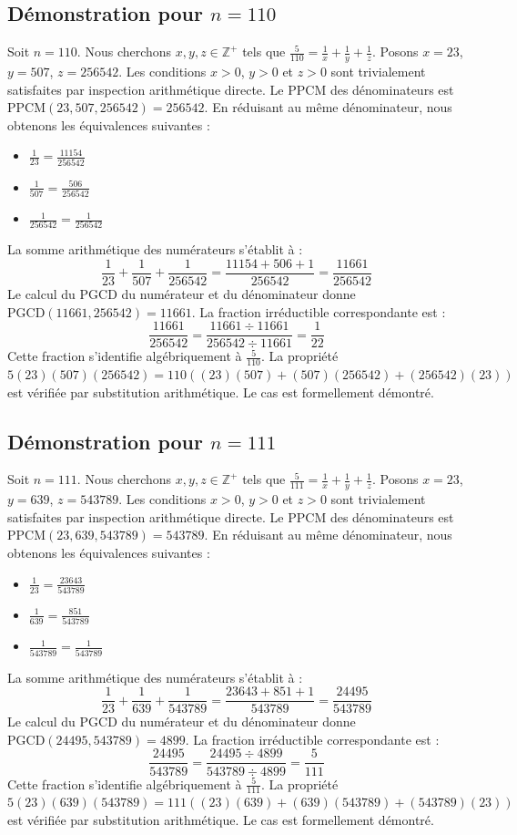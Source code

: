 \documentclass[12pt,a4paper]{article}
\begin{document}
\subsection{Démonstration pour $n = 110$}
Soit $n = 110$. Nous cherchons $x, y, z \in \mathbb{Z}^{+}$ tels que $\frac{5}{110} = \frac{1}{x} + \frac{1}{y} + \frac{1}{z}$.
Posons $x = 23$, $y = 507$, $z = 256542$.
Les conditions $x > 0$, $y > 0$ et $z > 0$ sont trivialement satisfaites par inspection arithmétique directe.
Le PPCM des dénominateurs est $\text{PPCM}(23, 507, 256542) = 256542$.
En réduisant au même dénominateur, nous obtenons les équivalences suivantes :
\begin{itemize}
    \item $\frac{1}{23} = \frac{11154}{256542}$
    \item $\frac{1}{507} = \frac{506}{256542}$
    \item $\frac{1}{256542} = \frac{1}{256542}$
\end{itemize}
La somme arithmétique des numérateurs s'établit à :
$$ \frac{1}{23} + \frac{1}{507} + \frac{1}{256542} = \frac{11154 + 506 + 1}{256542} = \frac{11661}{256542} $$
Le calcul du PGCD du numérateur et du dénominateur donne $\text{PGCD}(11661, 256542) = 11661$.
La fraction irréductible correspondante est :
$$ \frac{11661}{256542} = \frac{11661 \div 11661}{256542 \div 11661} = \frac{1}{22} $$
Cette fraction s'identifie algébriquement à $\frac{5}{110}$.
La propriété $5(23)(507)(256542) = 110((23)(507) + (507)(256542) + (256542)(23))$ est vérifiée par substitution arithmétique.
Le cas est formellement démontré.

\subsection{Démonstration pour $n = 111$}
Soit $n = 111$. Nous cherchons $x, y, z \in \mathbb{Z}^{+}$ tels que $\frac{5}{111} = \frac{1}{x} + \frac{1}{y} + \frac{1}{z}$.
Posons $x = 23$, $y = 639$, $z = 543789$.
Les conditions $x > 0$, $y > 0$ et $z > 0$ sont trivialement satisfaites par inspection arithmétique directe.
Le PPCM des dénominateurs est $\text{PPCM}(23, 639, 543789) = 543789$.
En réduisant au même dénominateur, nous obtenons les équivalences suivantes :
\begin{itemize}
    \item $\frac{1}{23} = \frac{23643}{543789}$
    \item $\frac{1}{639} = \frac{851}{543789}$
    \item $\frac{1}{543789} = \frac{1}{543789}$
\end{itemize}
La somme arithmétique des numérateurs s'établit à :
$$ \frac{1}{23} + \frac{1}{639} + \frac{1}{543789} = \frac{23643 + 851 + 1}{543789} = \frac{24495}{543789} $$
Le calcul du PGCD du numérateur et du dénominateur donne $\text{PGCD}(24495, 543789) = 4899$.
La fraction irréductible correspondante est :
$$ \frac{24495}{543789} = \frac{24495 \div 4899}{543789 \div 4899} = \frac{5}{111} $$
Cette fraction s'identifie algébriquement à $\frac{5}{111}$.
La propriété $5(23)(639)(543789) = 111((23)(639) + (639)(543789) + (543789)(23))$ est vérifiée par substitution arithmétique.
Le cas est formellement démontré.
\end{document}
